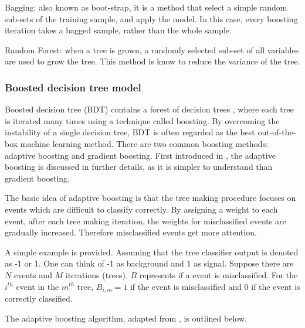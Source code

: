 Bagging: also known as boot-strap, it is a method that select a simple random sub-sets of the training sample, and apply the model. In this case, every boosting iteration takes a bagged sample, rather than the whole sample.

Random Forest: when a tree is grown, a randomly selected sub-set of all variables are used to grow the tree. This method is know to reduce the variance of the tree.

\subsubsection{Boosted decision tree model}
\label{sec:analysisBDT}

Boosted decision tree (BDT) contains a forest of decision trees , where each tree is iterated many times using a technique called boosting.   By overcoming the instability of a single  decision tree, BDT is often regarded as  the best out-of-the-box machine learning method. There are two common boosting methods: adaptive boosting and gradient boosting. First introduced in \cite{FREUND1997119}, the adaptive boosting is discussed in further details, as it is simpler to understand than gradient boosting.

The basic idea of adaptive boosting is that the tree making procedure focuses on events which are difficult to classify correctly. By assigning a weight to each event,   after each tree making iteration, the weights for misclassified events are gradually increased. Therefore misclassified events get more attention.

A simple example is provided. Assuming that the tree classifier output is denoted as  -1 or 1. One can think of -1 as background and 1 as signal. Suppose there are $N$ events and $M$ iterations (trees). $B$ represents if a event is misclassified. For the $i^{th}$ event in the  $m^{th}$ tree,  $B_{i,m} = 1$ if the event is misclassified and 0 if the event is correctly classified.

The adaptive boosting algorithm, adapted from \cite{hastie2009elements},  is outlined below.

